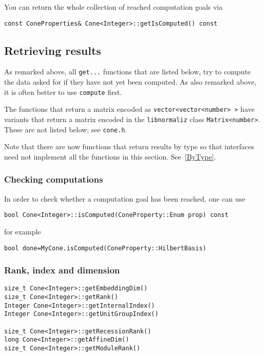 \documentclass[12pt,a4paper]{scrartcl}
\theoremstyle{definition}
\begin{document}
\begin{small}
You can return the whole collection of reached computation goals via
\begin{Verbatim}
const ConeProperties& Cone<Integer>::getIsComputed() const
\end{Verbatim}



\subsection{Retrieving results}

As remarked above, all \verb|get...| functions that are listed below, try to compute the data asked for if they have not yet been computed. As also remarked above, it is often better to use \verb|compute| first.

The functions that return a matrix encoded as \verb|vector<vector<number> >| have variants that return a matrix encoded in the \verb|libnormaliz| class \verb|Matrix<number>|. These are not listed below; see \verb|cone.h|.

Note that there are now functions that return results by type so that interfaces need not implement all the functions in this section. See~\ref{ByType}.

\subsubsection{Checking computations}
In order to check whether a computation goal has been reached, one can use
\begin{Verbatim}
bool Cone<Integer>::isComputed(ConeProperty::Enum prop) const 
\end{Verbatim}
for example
\begin{Verbatim}
bool done=MyCone.isComputed(ConeProperty::HilbertBasis)
\end{Verbatim}

\subsubsection{Rank, index and dimension}

\begin{Verbatim}
size_t Cone<Integer>::getEmbeddingDim()
size_t Cone<Integer>::getRank()
Integer Cone<Integer>::getInternalIndex()
Integer Cone<Integer>::getUnitGroupIndex()

size_t Cone<Integer>::getRecessionRank()
long Cone<Integer>::getAffineDim()
size_t Cone<Integer>::getModuleRank()
\end{Verbatim}


\end{small}
\end{document}
